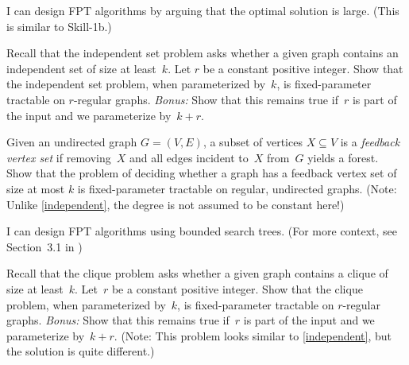 \documentclass[english]{uebung_cs}
\begin{document}

\instructions

\begin{skill}
  I can design FPT algorithms by arguing that the optimal solution is large. \normalfont (This is similar to Skill-1b.)
\end{skill}

\begin{exercise}\label{independent}
  Recall that the independent set problem asks whether a given graph contains an independent set of size at least~$k$.
  Let $r$ be a constant positive integer.
  Show that the independent set problem, when parameterized by~$k$, is fixed-parameter tractable on $r$-regular graphs.
  \emph{Bonus:} Show that this remains true if~$r$ is part of the input and we parameterize by~$k+r$.
\end{exercise}

\begin{exercise}
  Given an undirected graph $G = (V, E)$, a subset of vertices $X \subseteq V$ is a \emph{feedback vertex
    set} if removing~$X$ and all edges incident to~$X$ from~$G$ yields a forest. Show that the problem of deciding
  whether a graph has a feedback vertex set of size at most $k$ is fixed-parameter tractable on regular,
  undirected graphs. (Note: Unlike \ref{independent}, the degree is not assumed to be constant here!)
\end{exercise}


\begin{skill}
  I can design FPT algorithms using bounded search trees. \normalfont (For more context, see Section~3.1 in \cygan{})
\end{skill}

\begin{exercise}\label{clique}
  Recall that the clique problem asks whether a given graph contains a clique of size at least~$k$.
  Let~$r$ be a constant positive integer.
  Show that the clique problem, when parameterized by~$k$, is fixed-parameter tractable on $r$-regular graphs.
  \emph{Bonus:} Show that this remains true if~$r$ is part of the input and we parameterize by~$k+r$. (Note: This problem looks similar to \ref{independent}, but the solution is quite different.)
\end{exercise}
\end{document}
